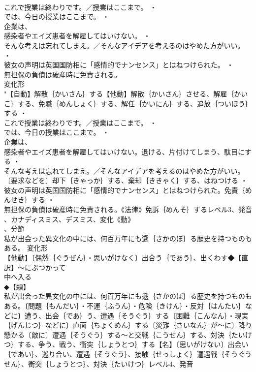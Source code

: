 \documentclass[8pt]{extreport}
\begin{document}
\begin{CJK}{UTF8}{min}
\\	これで授業は終わりです。／授業はここまで。 ・
\\	では、今日の授業はここまで。 ・
\\	企業は、
\\	感染者やエイズ患者を解雇してはいけない。 ・
\\	そんな考えは忘れてしまえ。／そんなアイデアを考えるのはやめた方がいい。 ・
\\	彼女の声明は英国国防相に「感情的でナンセンス」とはねつけられた。 ・
\\	無担保の負債は破産時に免責される。
\\	変化形 
\\	"【自動】解散｛かいさん｝する【他動】解散｛かいさん｝させる、解雇｛かいこ｝する、免職｛めんしょく｝する、解任｛かいにん｝する、追放｛ついほう｝する ・
\\	これで授業は終わりです。／授業はここまで。 ・
\\	では、今日の授業はここまで。 ・
\\	企業は、
\\	感染者やエイズ患者を解雇してはいけない。退ける、片付けてしまう、駄目にする ・
\\	そんな考えは忘れてしまえ。／そんなアイデアを考えるのはやめた方がいい。〔要求などを〕却下｛きゃっか｝する、棄却｛ききゃく｝する、はねつける ・
\\	彼女の声明は英国国防相に「感情的でナンセンス」とはねつけられた。免責｛めんせき｝する ・
\\	無担保の負債は破産時に免責される。《法律》免訴｛めんそ｝するレベル3、発音
\\	、カナディスミス、デスミス、変化《動》
\\	、分節
\\	私が出会った異文化の中には、何百万年にも遡｛さかのぼ｝る歴史を持つものもある。	変化形 
\\	【他動】〔偶然｛ぐうぜん｝・思いがけなく〕出合う｛であう｝、出くわす◆【直訳】～にぶつかって
\\	中へ入る
\\	◆【類】
\\	私が出会った異文化の中には、何百万年にも遡｛さかのぼ｝る歴史を持つものもある。〔問題｛もんだい｝・不運｛ふうん｝・危険｛きけん｝・反対｛はんたい｝などに〕遭う、出会｛であ｝う、遭遇｛そうぐう｝する〔困難｛こんなん｝・現実｛げんじつ｝などに〕直面｛ちょくめん｝する〔災難｛さいなん｝が～に〕降り懸かる〔敵に〕遭遇｛そうぐう｝する～と交戦｛こうせん｝する、対決｛たいけつ｝する、争う、戦う、衝突｛しょうとつ｝する【名】〔思いがけない〕出会い｛であい｝、巡り合い、遭遇｛そうぐう｝、接触｛せっしょく｝遭遇戦｛そうぐうせん｝、衝突｛しょうとつ｝、対決｛たいけつ｝レベル4、発音

\end{CJK}
\end{document}
